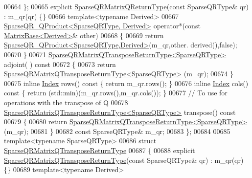 \begin{DoxyCode}
00664   \};
00665   \textcolor{keyword}{explicit} \hyperlink{struct_eigen_1_1_sparse_q_r_matrix_q_return_type}{SparseQRMatrixQReturnType}(\textcolor{keyword}{const} SparseQRType& qr) : m\_qr(qr) \{\}
00666   \textcolor{keyword}{template}<\textcolor{keyword}{typename} Derived>
00667   \hyperlink{struct_eigen_1_1_sparse_q_r___q_product}{SparseQR\_QProduct<SparseQRType, Derived>} operator*(\textcolor{keyword}{const} 
      \hyperlink{group___core___module_class_eigen_1_1_matrix_base}{MatrixBase<Derived>}& other)
00668   \{
00669     \textcolor{keywordflow}{return} \hyperlink{struct_eigen_1_1_sparse_q_r___q_product}{SparseQR\_QProduct<SparseQRType,Derived>}(m\_qr,other.
      derived(),\textcolor{keyword}{false});
00670   \}
00671   \hyperlink{struct_eigen_1_1_sparse_q_r_matrix_q_transpose_return_type}{SparseQRMatrixQTransposeReturnType<SparseQRType>} adjoint(
      )\textcolor{keyword}{ const}
00672 \textcolor{keyword}{  }\{
00673     \textcolor{keywordflow}{return} \hyperlink{struct_eigen_1_1_sparse_q_r_matrix_q_transpose_return_type}{SparseQRMatrixQTransposeReturnType<SparseQRType>}
      (m\_qr);
00674   \}
00675   \textcolor{keyword}{inline} \hyperlink{namespace_eigen_a62e77e0933482dafde8fe197d9a2cfde}{Index} rows()\textcolor{keyword}{ const }\{ \textcolor{keywordflow}{return} m\_qr.rows(); \}
00676   \textcolor{keyword}{inline} \hyperlink{namespace_eigen_a62e77e0933482dafde8fe197d9a2cfde}{Index} cols()\textcolor{keyword}{ const }\{ \textcolor{keywordflow}{return} (std::min)(m\_qr.rows(),m\_qr.cols()); \}
00677   \textcolor{comment}{// To use for operations with the transpose of Q}
00678   \hyperlink{struct_eigen_1_1_sparse_q_r_matrix_q_transpose_return_type}{SparseQRMatrixQTransposeReturnType<SparseQRType>} 
      transpose()\textcolor{keyword}{ const}
00679 \textcolor{keyword}{  }\{
00680     \textcolor{keywordflow}{return} \hyperlink{struct_eigen_1_1_sparse_q_r_matrix_q_transpose_return_type}{SparseQRMatrixQTransposeReturnType<SparseQRType>}
      (m\_qr);
00681   \}
00682   \textcolor{keyword}{const} SparseQRType& m\_qr;
00683 \};
00684 
00685 \textcolor{keyword}{template}<\textcolor{keyword}{typename} SparseQRType>
00686 \textcolor{keyword}{struct }\hyperlink{struct_eigen_1_1_sparse_q_r_matrix_q_transpose_return_type}{SparseQRMatrixQTransposeReturnType}
00687 \{
00688   \textcolor{keyword}{explicit} \hyperlink{struct_eigen_1_1_sparse_q_r_matrix_q_transpose_return_type}{SparseQRMatrixQTransposeReturnType}(\textcolor{keyword}{const} SparseQRType& qr) : 
      m\_qr(qr) \{\}
00689   \textcolor{keyword}{template}<\textcolor{keyword}{typename} Derived>

\end{DoxyCode}
